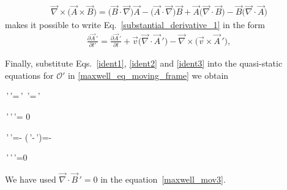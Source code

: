 \documentclass[12pt,a4paper,oneside]{book}
\begin{document}
\begin{onehalfspace}
\begin{equation}
\begin{aligned}
		\vec{\nabla}\times\big(\vec{A}\times\vec{B}\big)=\big(\vec{B}\cdot 
		\vec{\nabla}\big)\vec{A}-\big(\vec{A}\cdot\vec{\nabla}\big)\vec{B}+
		\vec{A}\big(\vec{\nabla}\cdot\vec{B}\big)- 
		\vec{B}\big(\vec{\nabla}\cdot\vec{A}\big)
	\end{aligned}
\end{equation} 
makes it possible to write Eq.~\ref{substantial_derivative_1} in the form
\begin{equation}\label{ident3}
	\begin{aligned}
		\frac{\partial \vec{A}\,'}{\partial t'} = \frac{\partial 
		\vec{A}\,'}{\partial t} + 
		\vec{v}\big(\vec{\nabla}\cdot\vec{A}\,'\big)-\vec{\nabla}\times\big(\vec{v}\times\vec{A}\,'\big),
	\end{aligned}
\end{equation} 

\begin{mybox}
	Finally, substitute Eqs.~\ref{ident1}, \ref{ident2} and \ref{ident3} into 
	the quasi-static equations for $\mathcal{O}'$ in 
	\ref{maxwell_eq_moving_frame} we obtain 
	\begin{flalign}\label{maxwell_mov1}
		\vec{\nabla}\,'\times{}\,'=\,' 
		\quad\Rightarrow\quad\vec{\nabla}\times{}\,'=\,'\qquad{}
	\end{flalign} 
	\begin{flalign}\label{maxwell_mov2}
		\vec{\nabla}\,'\cdot{}\,'\quad\Rightarrow\quad\vec{\nabla}\cdot{}\,'=
		 0\qquad{}
	\end{flalign} 
	\begin{flalign}\label{maxwell_mov3}
		\vec{\nabla}\,'\times{}\,'=- 
		\quad\Rightarrow\quad\vec{\nabla}\times\big(\,'-\times{}\,'\big)=-\qquad{}
	\end{flalign} 
	\begin{flalign}\label{maxwell_mov4}
		\vec{\nabla}\,'\cdot{}\,'\quad\Rightarrow\quad\vec{\nabla}\cdot{}\,'=0\qquad{}
	\end{flalign} 
	We have used $\vec{\nabla}\cdot\vec{B}\,'=0$ in the 
	equation~\ref{maxwell_mov3}. 
\end{mybox}


\end{onehalfspace}
\end{document}
